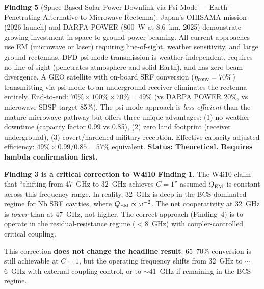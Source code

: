 \documentclass[11pt]{article}
\newcommand{\QEM}{Q_{\rm EM}}
\begin{document}
\begin{tcolorbox}[colback=blue!5!white, colframe=blue!60!black,
  title=\textbf{W4i13 P4: Five Key Findings}]
\textbf{Finding 5} (Space-Based Solar Power Downlink via Psi-Mode ---
Earth-Penetrating Alternative to Microwave Rectenna):
Japan's OHISAMA mission (2026 launch) and DARPA POWER (800~W at 8.6~km,
2025) demonstrate growing investment in space-to-ground power beaming.
All current approaches use EM (microwave or laser) requiring line-of-sight,
weather sensitivity, and large ground rectennas. DFD psi-mode transmission
is weather-independent, requires no line-of-sight (penetrates atmosphere
and solid Earth), and has zero beam divergence. A GEO satellite with
on-board SRF conversion ($\eta_{\rm conv} = 70\%$) transmitting via
psi-mode to an underground receiver eliminates the rectenna entirely.
End-to-end: $70\% \times 100\% \times 70\% = 49\%$ (vs DARPA POWER 20\%,
vs microwave SBSP target 85\%). The psi-mode approach is \emph{less
efficient} than the mature microwave pathway but offers three unique
advantages: (1) no weather downtime (capacity factor 0.99 vs 0.85),
(2) zero land footprint (receiver underground), (3) covert/hardened
military reception. Effective capacity-adjusted efficiency:
$49\% \times 0.99/0.85 = 57\%$ equivalent. \textbf{Status: Theoretical.
Requires lambda confirmation first.}

\end{tcolorbox}

\begin{tcolorbox}[colback=red!5!white, colframe=red!60!black,
  title=\textbf{CRITICAL CORRECTION FLAG}]
\textbf{Finding 3 is a critical correction to W4i10 Finding 1.} The W4i10
claim that ``shifting from 47~GHz to 32~GHz achieves $C = 1$'' assumed
$\QEM$ is constant across this frequency range. In reality, 32~GHz is
deep in the BCS-dominated regime for Nb SRF cavities, where $\QEM \propto
\omega^{-2}$. The net cooperativity at 32~GHz is \emph{lower} than at
47~GHz, not higher. The correct approach (Finding~4) is to operate in the
residual-resistance regime ($<$8~GHz) with coupler-controlled critical
coupling.

This correction \textbf{does not change the headline result}: 65--70\%
conversion is still achievable at $C = 1$, but the operating frequency
shifts from 32~GHz to $\sim$6~GHz with external coupling control, or to
$\sim$41~GHz if remaining in the BCS regime.
\end{tcolorbox}

\newpage

\end{document}
